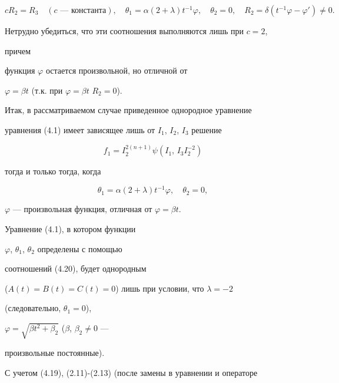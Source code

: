 $$


cR_2=R_3 \quad (c\text{ --- константа}),\quad


\theta_1=\alpha(2+\lambda)t^{-1}\varphi,\quad


\theta_2=0,\quad R_2=\delta(t^{-1}\varphi-\varphi')\ne 0.


$$


Нетрудно убедиться, что эти соотношения выполняются лишь при $c=2$,


причем


функция $\varphi$ остается произвольной, но отличной от


$\varphi=\beta t$ (т.к. при $\varphi=\beta t$\; $R_2=0$).





Итак, в рассматриваемом случае приведенное однородное уравнение


уравнения (4.1) имеет зависящее лишь от $I_1$, $I_2$, $I_3$ решение


\begin{equation}


f_1=I_2^{2(n+1)}\psi(I_1,\,I_3I^{-2}_2)\tag{4.19}


\end{equation}


тогда и только тогда, когда


\begin{equation}


\theta_1=\alpha(2+\lambda)t^{-1}\varphi,\quad \theta_2=0,\tag{4.20}


\end{equation}


$\varphi$ --- произвольная функция, отличная от $\varphi=\beta t$.





Уравнение (4.1), в котором функции


$\varphi$, $\theta_1$, $\theta_2$ определены с помощью


соотношений (4.20), будет однородным


($A(t)=B(t)=C(t)=0$) лишь при условии, что $\lambda=-2$


(следовательно, $\theta_1=0$),


$\varphi=\sqrt{\beta t^2+\beta_2}$ ($\beta$, $\beta_2\ne 0$ ---


произвольные постоянные).





С учетом (4.19), (2.11)-(2.13) (после замены в уравнении и операторе


